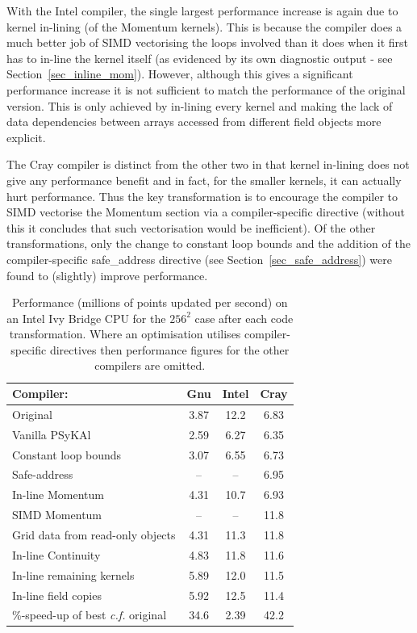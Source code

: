 \documentclass[gmdd, manuscript]{copernicus}
\begin{document}
With the Intel compiler, the single largest performance increase is
again due to kernel in-lining (of the Momentum kernels). This is
because the compiler does a much better job of SIMD vectorising the
loops involved than it does when it first has to in-line the kernel
itself (as evidenced by its own diagnostic output - see
Section~\ref{sec_inline_mom}). However, although this gives a
significant performance increase it is not sufficient to match the
performance of the original version. This is only achieved by
in-lining every kernel and making the lack of data dependencies
between arrays accessed from different field objects more explicit.

The Cray compiler is distinct from the other two in that kernel
in-lining does not give any performance benefit and in fact, for the
smaller kernels, it can actually hurt performance. Thus the key
transformation is to encourage the compiler to SIMD vectorise the
Momentum section via a compiler-specific directive (without this it
concludes that such vectorisation would be inefficient). Of the other
transformations, only the change to constant loop bounds and the
addition of the compiler-specific safe\_address directive (see
Section~\ref{sec_safe_address}) were found to (slightly) improve
performance.

\begin{table}[!t]
  \caption{Performance (millions of points updated per second) on an Intel
    Ivy Bridge CPU for the
  $256^2$ case after each code transformation. Where an optimisation
  utilises compiler-specific directives then performance figures for
  the other compilers are omitted.}
\label{TABLE_opt_breakdown}
\centering
\begin{tabular}{l|c|c|c}
\hline
Compiler:            & Gnu & Intel & Cray  \\
\hline
Original             & 3.87 & 12.2 & 6.83 \\
Vanilla {PS}y{KA}l   & 2.59 & 6.27 & 6.35 \\
Constant loop bounds & 3.07 & 6.55 & 6.73 \\
Safe-address         & --   & --   & 6.95 \\
In-line Momentum     & 4.31 & 10.7 & 6.93 \\
SIMD Momentum        & --   & --   & 11.8 \\
\parbox{2.5cm}{\raggedright Grid data from read-only objects} & 4.31 & 11.3 & 11.8 \\
In-line Continuity         & 4.83 & 11.8 & 11.6 \\
In-line remaining kernels  & 5.89 & 12.0 & 11.5 \\
In-line field copies       & 5.92 & 12.5 & 11.4 \\
\hline
\parbox{2.5cm}{\raggedright \%-speed-up of best \textit{c.f.} original} & 34.6 & 2.39 & 42.2 \\
\hline
\end{tabular}
\end{table}
\end{document}
